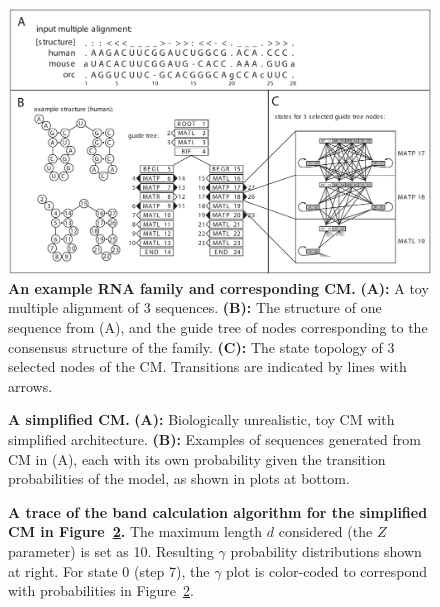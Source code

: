 \documentclass[11pt]{article}
\newif\ifdraft
\begin{document}
\ifdraft
 \relax
\else
\newpage
\begin{figure}
\begin{center}
\includegraphics[width=6.4in]{figs/d4fig_0}
\caption{\textbf{An example RNA family and corresponding CM.}
  \textbf{(A):} A toy multiple alignment of 3 sequences. \textbf{(B):}
  The structure of one sequence from (A), and the guide tree of nodes
  corresponding to the consensus structure of the
  family. \textbf{(C):} The state topology of 3 selected nodes of the
  CM. Transitions are indicated by lines with arrows.}
\label{fig:cmintro}
\end{center}
\end{figure}

\begin{figure}
\begin{center}
\caption{\textbf{A simplified CM.} \textbf{(A):} Biologically
  unrealistic, toy CM with simplified architecture. \textbf{(B):} Examples of
  sequences generated from CM in (A), each with its own probability
  given the transition probabilities of the model, as shown in plots at
   bottom.}
\label{fig:aprioriAB}
\end{center}
\end{figure}

\begin{figure}
  \begin{center}
    \caption{\textbf{A trace of the band calculation
	algorithm for the simplified CM in Figure~\ref{fig:aprioriAB}.} 
      The maximum length $d$ considered (the $Z$ parameter) is set as
      10. Resulting $\gamma$ probability distributions shown at right. For
      state $0$ (step 7), the $\gamma$ plot is color-coded to correspond
      with probabilities in Figure~\ref{fig:aprioriAB}.}
    \label{fig:aprioriC}
  \end{center}
\end{figure}
\end{document}
